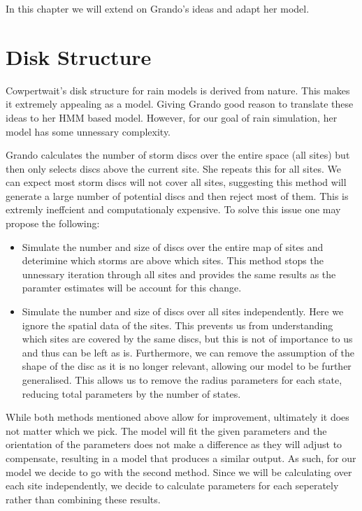 In this chapter we will extend on Grando's ideas and adapt her model.


\section{Disk Structure}
Cowpertwait's disk structure for rain models is derived from nature. This makes it extremely appealing as a model. Giving Grando good reason to translate these ideas to her HMM based model. However, for our goal of rain simulation, her model has some unnessary complexity. 

Grando calculates the number of storm discs over the entire space (all sites) but then only selects discs above the current site. She repeats this for all sites. We can expect most storm discs will not cover all sites, suggesting this method will generate a large number of potential discs and then reject most of them. This is extremly ineffcient and computationaly expensive. To solve this issue one may propose the following:
\begin{itemize}
    \item Simulate the number and size of discs over the entire map of sites and deterimine which storms are above which sites. This method stops the unnessary iteration through all sites and provides the same results as the paramter estimates will be account for this change.
    \item Simulate the number and size of discs over all sites independently. Here we ignore the spatial data of the sites. This prevents us from understanding which sites are covered by the same discs, but this is not of importance to us and thus can be left as is. Furthermore, we can remove the assumption of the shape of the disc as it is no longer relevant, allowing our model to be further generalised. This allows us to remove the radius parameters for each state, reducing total parameters by the number of states.
\end{itemize}

While both methods mentioned above allow for improvement, ultimately it does not matter which we pick. The model will fit the given parameters and the orientation of the parameters does not make a difference as they will adjust to compensate, resulting in a model that produces a similar output. As such, for our model we decide to go with the second method. Since we will be calculating over each site independently, we decide to calculate parameters for each seperately rather than combining these results. 



